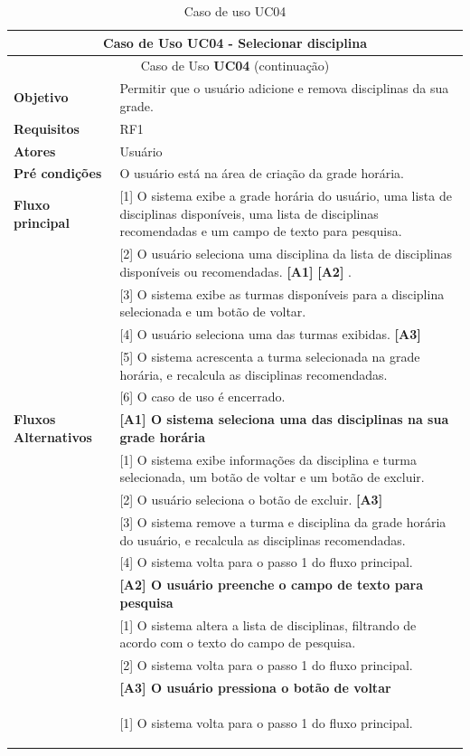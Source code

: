 \begin{longtable}{ | m{} | m{} | }
    
    \hline\hline
    \multicolumn{2}{|c|}{Caso de Uso \textbf{UC04} - Selecionar disciplina}\tabularnewline\hline\hline\endfirsthead
    \hline\hline
    \multicolumn{2}{|c|}{Caso de Uso \textbf{UC04} (continuação)}\tabularnewline\hline\hline\endhead
    \hline\endfoot
    \hline\caption{Caso de uso UC04}\endlastfoot

    \textbf{Objetivo} & Permitir que o usuário adicione e remova disciplinas da sua grade.\tabularnewline\hline
    \textbf{Requisitos} & RF1\tabularnewline\hline
    \textbf{Atores} & Usuário\tabularnewline\hline
    \textbf{Pré condições} & O usuário está na área de criação da grade horária.\tabularnewline\hline

    \multirow{1}{*}{\textbf{Fluxo principal}} & [1] O sistema exibe a grade horária do usuário, uma lista de disciplinas disponíveis, uma lista de disciplinas recomendadas e um campo de texto para pesquisa.\tabularnewline\cline{2-2}
    & [2] O usuário seleciona uma disciplina da lista de disciplinas disponíveis ou recomendadas. \textbf{[A1]} \textbf{[A2]} .\tabularnewline\cline{2-2}
    & [3] O sistema exibe as turmas disponíveis para a disciplina selecionada e um botão de voltar.\tabularnewline\cline{2-2}
    & [4] O usuário seleciona uma das turmas exibidas. \textbf{[A3]}\tabularnewline\cline{2-2}
    & [5] O sistema acrescenta a turma selecionada na grade horária, e recalcula as disciplinas recomendadas. \tabularnewline\cline{2-2}
    & [6] O caso de uso é encerrado.\tabularnewline\hline

    \multirow{1}{*}{\textbf{Fluxos Alternativos}} & \textbf{[A1] O sistema seleciona uma das disciplinas na sua grade horária}\tabularnewline\cline{2-2}
    & [1] O sistema exibe informações da disciplina e turma selecionada, um botão de voltar e um botão de excluir.\tabularnewline\cline{2-2} 
    & [2] O usuário seleciona o botão de excluir. \textbf{[A3]}\tabularnewline\cline{2-2} 
    & [3] O sistema remove a turma e disciplina da grade horária do usuário, e recalcula as disciplinas recomendadas. \tabularnewline\cline{2-2}
    & [4] O sistema volta para o passo 1 do fluxo principal. \tabularnewline\cline{2-2}

    & \textbf{[A2] O usuário preenche o campo de texto para pesquisa}\tabularnewline\cline{2-2}
    & [1] O sistema altera a lista de disciplinas, filtrando de acordo com o texto do campo de pesquisa. \tabularnewline\cline{2-2}
    & [2] O sistema volta para o passo 1 do fluxo principal. \tabularnewline\cline{2-2}

    & \textbf{[A3] O usuário pressiona o botão de voltar}\tabularnewline\cline{2-2}
    & [1] O sistema volta para o passo 1 do fluxo principal. %

    \label{tab:uc04}
\end{longtable}


